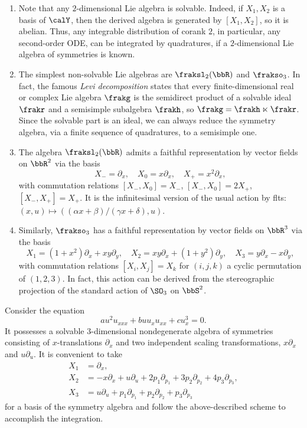 \begin{example}
    \begin{enumerate}
        \item Note that any $2$-dimensional Lie algebra is solvable. Indeed, if $X_1,X_2$ is a basis of $\calY$, then the derived algebra is generated by $[X_1,X_2]$, so it is abelian. Thus, any integrable distribution of corank $2$, in particular, any second-order ODE, can be integrated by quadratures, if a $2$-dimensional Lie algebra of symmetries is known.
        \item The simplest non-solvable Lie algebras are $\fraksl_2(\bbR)$ and $\frakso_3$. In fact, the famous \emph{Levi decomposition} states that every finite-dimensional real or complex Lie algebra $\frakg$ is the semidirect product of a solvable ideal $\frakr$ and a semisimple subalgebra $\frakh$, so $\frakg=\frakh\ltimes\frakr$. Since the solvable part is an ideal, we can always reduce the symmetry algebra, via a finite sequence of quadratures, to a semisimple one.
        \item The algebra $\fraksl_2(\bbR)$ admits a faithful representation by vector fields on $\bbR^2$ via the basis 
        \[X_-=\partial_x,\quad X_0=x\partial_x,\quad X_+=x^2\partial_x,\label{eq sl2 action on plane}\]
        with commutation relations $[X_-,X_0]=X_-$, $[X_-,X_0]=2X_+$, $[X_-,X_+]=X_+$. It is the infinitesimal version of the usual action by \glspl{flt}: $(x,u)\mapsto ((\alpha x+\beta)/(\gamma x+\delta),u)$.
        \item Similarly, $\frakso_3$ has a faithful representation by vector fields on $\bbR^3$ via the basis 
        \[X_1=(1+x^2)\partial_x+xy\partial_y,\quad X_2=xy\partial_x+(1+y^2)\partial_y,\quad X_3=y\partial_x-x\partial_y,\]
        with commutation relations $[X_i,X_j]=X_k$ for $(i,j,k)$ a cyclic permutation of $(1,2,3)$. In fact, this action can be derived from the stereographic projection of the standard action of $\SO_3$ on $\bbS^2$.
    \end{enumerate}
\end{example}

\begin{example}
    Consider the equation 
    \[au^2u_{xxx}+buu_xu_{xx}+cu_x^3=0.\]
    It possesses a solvable $3$-dimensional nondegenerate algebra of symmetries consisting of $x$-translations $\partial_x$ and two independent scaling transformations, $x\partial_x$ and $u\partial_u$. It is convenient to take 
    \begin{align}
        X_1&=\partial_x,\\
        X_2&=-x\partial_x+u\partial_u+2p_1\partial_{p_1}+3p_2\partial_{p_2}+4p_3\partial_{p_3},\\
        X_3&=u\partial_u+p_1\partial_{p_1}+p_2\partial_{p_2}+p_3\partial_{p_3}
    \end{align} 
    for a basis of the symmetry algebra and follow the above-described scheme to accomplish the integration.
\end{example}

